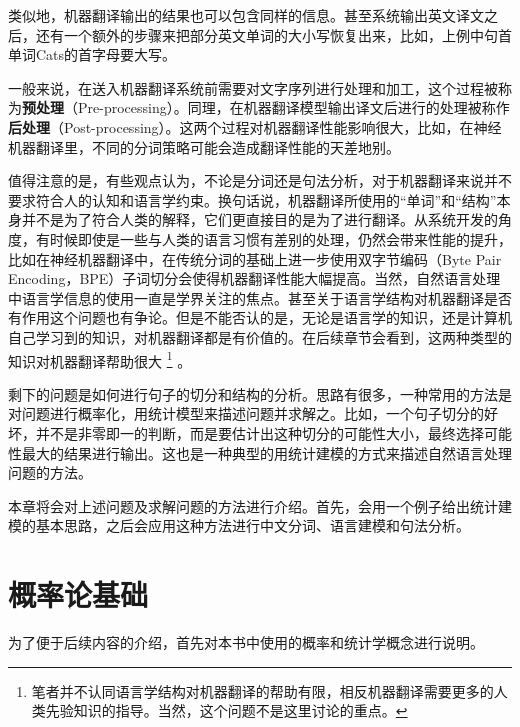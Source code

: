 \parinterval 类似地，机器翻译输出的结果也可以包含同样的信息。甚至系统输出英文译文之后，还有一个额外的步骤来把部分英文单词的大小写恢复出来，比如，上例中句首单词Cats的首字母要大写。

\parinterval 一般来说，在送入机器翻译系统前需要对文字序列进行处理和加工，这个过程被称为{\small\sffamily\bfseries{预处理}}（Pre-processing）。同理，在机器翻译模型输出译文后进行的处理被称作{\small\sffamily\bfseries{后处理}}（Post-processing）。这两个过程对机器翻译性能影响很大，比如，在神经机器翻译里，不同的分词策略可能会造成翻译性能的天差地别。

\parinterval 值得注意的是，有些观点认为，不论是分词还是句法分析，对于机器翻译来说并不要求符合人的认知和语言学约束。换句话说，机器翻译所使用的``单词''和``结构''本身并不是为了符合人类的解释，它们更直接目的是为了进行翻译。从系统开发的角度，有时候即使是一些与人类的语言习惯有差别的处理，仍然会带来性能的提升，比如在神经机器翻译中，在传统分词的基础上进一步使用双字节编码（Byte Pair Encoding，BPE）子词切分会使得机器翻译性能大幅提高。当然，自然语言处理中语言学信息的使用一直是学界关注的焦点。甚至关于语言学结构对机器翻译是否有作用这个问题也有争论。但是不能否认的是，无论是语言学的知识，还是计算机自己学习到的知识，对机器翻译都是有价值的。在后续章节会看到，这两种类型的知识对机器翻译帮助很大 \footnote[1]{笔者并不认同语言学结构对机器翻译的帮助有限，相反机器翻译需要更多的人类先验知识的指导。当然，这个问题不是这里讨论的重点。} 。

\parinterval 剩下的问题是如何进行句子的切分和结构的分析。思路有很多，一种常用的方法是对问题进行概率化，用统计模型来描述问题并求解之。比如，一个句子切分的好坏，并不是非零即一的判断，而是要估计出这种切分的可能性大小，最终选择可能性最大的结果进行输出。这也是一种典型的用统计建模的方式来描述自然语言处理问题的方法。

\parinterval 本章将会对上述问题及求解问题的方法进行介绍。首先，会用一个例子给出统计建模的基本思路，之后会应用这种方法进行中文分词、语言建模和句法分析。
\vspace{-1em}


\sectionnewpage
\section{概率论基础}
\parinterval 为了便于后续内容的介绍，首先对本书中使用的概率和统计学概念进行说明。

